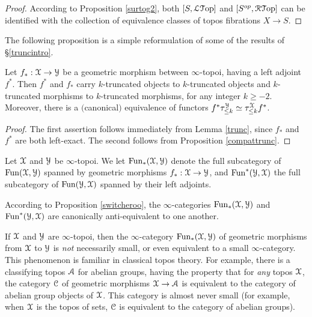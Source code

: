 \begin{proof}
According to Proposition \ref{surtog2}, both $[S, \operatorname{\mathcal{L}{\mathcal T}op}]$ and $[S^{op}, \operatorname{\mathcal{R}{\mathcal T}op}]$ can be identified with the collection of equivalence classes of topos fibrations $X \rightarrow S$.
\end{proof}

The following proposition is a simple reformulation of some of the results of \S \ref{truncintro}.

\begin{proposition}
Let $f_{\ast}: \operatorname{\mathcal{X}} \rightarrow \operatorname{\mathcal{Y}}$ be a geometric morphism between $\infty$-topoi, having a left adjoint $f^{\ast}$. Then $f^{\ast}$ and
$f_{\ast}$ carry $k$-truncated objects to $k$-truncated objects and $k$-truncated morphisms to $k$-truncated morphisms, for any integer $k \geq -2$. Moreover, there is a $($canonical$)$ equivalence
of functors $f^{\ast} \tau^{\operatorname{\mathcal{Y}}}_{\leq k} \simeq \tau^{\operatorname{\mathcal{X}}}_{\leq k} f^{\ast}$.
\end{proposition}

\begin{proof}
The first assertion follows immediately from Lemma \ref{trunc}, since $f_{\ast}$ and $f^{\ast}$ are both left-exact. The second follows from Proposition \ref{compattrunc}.
\end{proof}

\begin{definition}\label{defhomst}
Let $\operatorname{\mathcal{X}}$ and $\operatorname{\mathcal{Y}}$ be $\infty$-topoi. We let
$\operatorname{Fun}_{\ast}(\operatorname{\mathcal{X}}, \operatorname{\mathcal{Y}})$ denote the full subcategory of $\operatorname{Fun}(\operatorname{\mathcal{X}},\operatorname{\mathcal{Y}})$ spanned by
geometric morphisms $f_{\ast}: \operatorname{\mathcal{X}} \rightarrow \operatorname{\mathcal{Y}}$, and
$\operatorname{Fun}^{\ast}(\operatorname{\mathcal{Y}}, \operatorname{\mathcal{X}})$ the full subcategory of $\operatorname{Fun}(\operatorname{\mathcal{Y}},\operatorname{\mathcal{X}})$ spanned by
their left adjoints.
\end{definition}

\begin{remark}
According to Proposition \ref{switcheroo}, the $\infty$-categories
$\operatorname{Fun}_{\ast}(\operatorname{\mathcal{X}}, \operatorname{\mathcal{Y}})$ and $\operatorname{Fun}^{\ast}(\operatorname{\mathcal{Y}}, \operatorname{\mathcal{X}})$ are canonically anti-equivalent to one another.
\end{remark}

\begin{warning}\label{tooobig}
If $\operatorname{\mathcal{X}}$ and $\operatorname{\mathcal{Y}}$ are $\infty$-topoi, then the $\infty$-category $\operatorname{Fun}_{\ast}(\operatorname{\mathcal{X}}, \operatorname{\mathcal{Y}})$ of
geometric morphisms from $\operatorname{\mathcal{X}}$ to $\operatorname{\mathcal{Y}}$ is {\em not} necessarily small, or even equivalent to a small $\infty$-category. This phenomenon is familiar in classical topos theory. For example,
there is a classifying topos $\operatorname{\mathcal{A}}$ for abelian groups, having the property that for {\em any} topos
$\operatorname{\mathcal{X}}$, the category $\operatorname{\mathcal{C}}$ of geometric morphisms $\operatorname{\mathcal{X}} \rightarrow \operatorname{\mathcal{A}}$ is equivalent to the category of abelian group objects of $\operatorname{\mathcal{X}}$. This category is almost never small (for example, when $\operatorname{\mathcal{X}}$ is the topos of sets, $\operatorname{\mathcal{C}}$ is equivalent to the category of abelian groups).
\end{warning}

